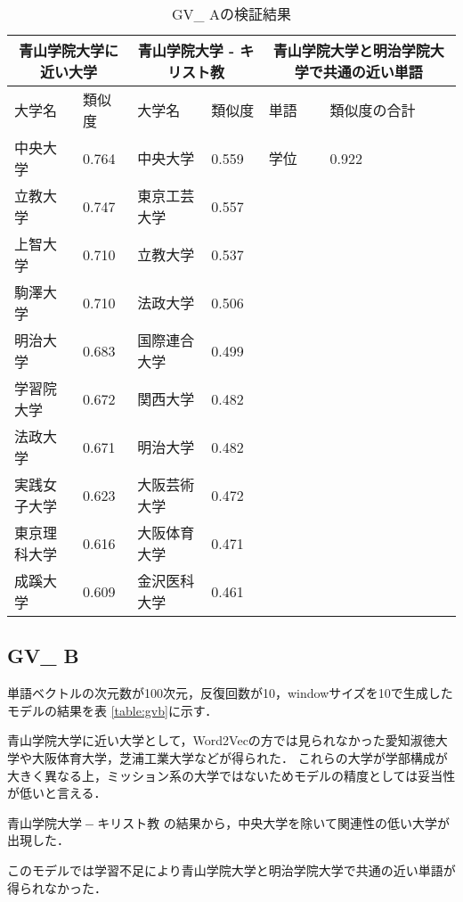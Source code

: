 \begin{table}[H]
\caption{GV\_ Aの検証結果}
\centering
\footnotesize
\begin{tabular}{ll|ll|ll}
\hline
\multicolumn{2}{c}{青山学院大学に近い大学} & \multicolumn{2}{c}{青山学院大学 - キリスト教} & \multicolumn{2}{c}{青山学院大学と明治学院大学で共通の近い単語}
\\ \hline
大学名 & 類似度 & 大学名 & 類似度 & 単語 & 類似度の合計
\\ \hline \hline
中央大学 & 0.764 & 中央大学 & 0.559 & 学位 & 0.922\\
立教大学 & 0.747 & 東京工芸大学 & 0.557 & & \\
上智大学 & 0.710 & 立教大学 & 0.537 & & \\
駒澤大学 & 0.710 & 法政大学 & 0.506 & & \\
明治大学 & 0.683 & 国際連合大学 & 0.499 & & \\
学習院大学 & 0.672 & 関西大学 & 0.482 & & \\
法政大学 & 0.671 & 明治大学 & 0.482 & & \\
実践女子大学 & 0.623 & 大阪芸術大学 & 0.472 & & \\
東京理科大学 & 0.616 & 大阪体育大学 & 0.471 & & \\
成蹊大学 & 0.609 & 金沢医科大学 & 0.461 & & \\ \hline
\end{tabular}
\label{table:gva}
\end{table}


\subsection{GV\_ B}
単語ベクトルの次元数が100次元，反復回数が10，windowサイズを10で生成したモデルの結果を表 \ref{table:gvb}に示す．

青山学院大学に近い大学として，Word2Vecの方では見られなかった愛知淑徳大学や大阪体育大学，芝浦工業大学などが得られた．
これらの大学が学部構成が大きく異なる上，ミッション系の大学ではないためモデルの精度としては妥当性が低いと言える．

$ 青山学院大学 - キリスト教 $ の結果から，中央大学を除いて関連性の低い大学が出現した．

このモデルでは学習不足により青山学院大学と明治学院大学で共通の近い単語が得られなかった．


